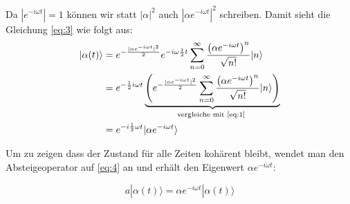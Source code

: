 Da \(|e^{-i\omega t}|=1\) können wir statt \(|\alpha|^2\) auch \(|\alpha e^{-i\omega t}|^2\) schreiben. Damit sieht die Gleichung \eqref{eq:3} wie folgt aus:
\begin{align}
  \label{eq:4}
   |\alpha (t)\rangle &= e^{-\frac{|\alpha e^{-i\omega t} |^2}{2}}e^{-i\omega\frac{1}{2}t}  \sum_{n=0}^{\infty} \frac{\left( \alpha e^{ -i\omega  t}\right)^n }{\sqrt{n!}}   |n\rangle\\
&=e^{-\frac{1}{2}i\omega t} \underbrace{\left(e^{-\frac{|\alpha e^{-i\omega t} |^2}{2}}  \sum_{n=0}^{\infty} \frac{\left( \alpha e^{ -i\omega  t}\right)^n }{\sqrt{n!}}   |n\rangle\right)}_{\text{vergleiche mit \eqref{eq:1} }}\\
&=e^{-i\frac{1}{2}\omega t}|\alpha e^{-i\omega t}\rangle
\end{align}


Um zu zeigen dass der Zustand für alle Zeiten kohärent bleibt, wendet man den Absteigeoperator auf \eqref{eq:4} an und erhält den Eigenwert \(\alpha e^{-i\omega t}\):

\begin{equation}
  \label{eq:5}
  a |\alpha(t)\rangle = \alpha e^{-i\omega t} |\alpha(t)\rangle
\end{equation}





